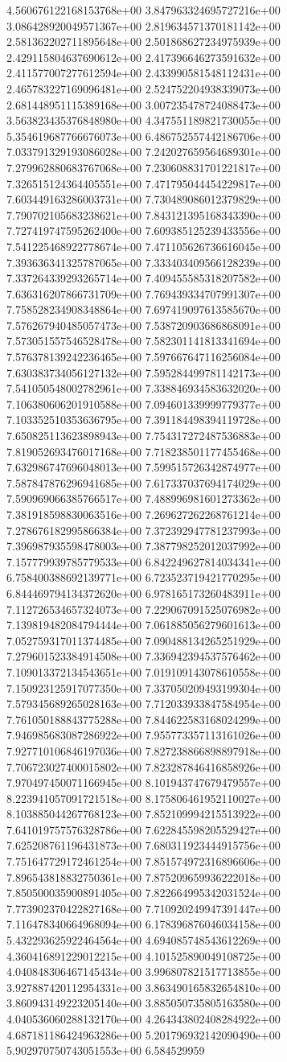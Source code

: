 4.560676122168153768e+00	3.847963324695727216e+00	3.086428920049571367e+00	2.819634571370181142e+00	2.581362202711895648e+00	2.501868627234975939e+00	2.429115804637690612e+00	2.417396646273591632e+00	2.411577007277612594e+00	2.433990581548112431e+00	2.465783227169096481e+00	2.524752204938339073e+00	2.681448951115389168e+00	3.007235478724088473e+00	3.563823435376848980e+00	4.347551189821730055e+00	5.354619687766676073e+00	6.486752557442186706e+00	7.033791329193086028e+00	7.242027659564689301e+00	7.279962880683767068e+00	7.230608831701221817e+00	7.326515124364405551e+00	7.471795044454229817e+00	7.603449163286003731e+00	7.730489086012379829e+00	7.790702105683238621e+00	7.843121395168343390e+00	7.727419747595262400e+00	7.609385125239433556e+00	7.541225468922778674e+00	7.471105626736616045e+00	7.393636341325787065e+00	7.333403409566128239e+00	7.337264339293265714e+00	7.409455585318207582e+00	7.636316207866731709e+00	7.769439334707991307e+00	7.758528234908348864e+00	7.697419097613585670e+00	7.576267940485057473e+00	7.538720903686868091e+00	7.573051557546528478e+00	7.582301141813341694e+00	7.576378139242236465e+00	7.597667647116256084e+00	7.630383734056127132e+00	7.595284499781142173e+00	7.541050548002782961e+00	7.338846934583632020e+00	7.106380606201910588e+00	7.094601339999779377e+00	7.103352510353636795e+00	7.391184498394119728e+00	7.650825113623898943e+00	7.754317272487536883e+00	7.819052693476017168e+00	7.718238501177455468e+00	7.632986747696048013e+00	7.599515726342874977e+00	7.587847876296941685e+00	7.617337037694174029e+00	7.590969066385766517e+00	7.488996981601273362e+00	7.381918598830063516e+00	7.269627262268761214e+00	7.278676182995866384e+00	7.372392947781237993e+00	7.396987935598478003e+00	7.387798252012037992e+00	7.157779939785779533e+00	6.842249627814034341e+00	6.758400388692139771e+00	6.723523719421770295e+00	6.844469794134372620e+00	6.978165173260483911e+00	7.112726534657324073e+00	7.229067091525076982e+00	7.139819482084794444e+00	7.061885056279601613e+00	7.052759317011374485e+00	7.090488134265251929e+00	7.279601523384914508e+00	7.336942394537576462e+00	7.109013372134543651e+00	7.019109143078610558e+00	7.150923125917077350e+00	7.337050209493199304e+00	7.579345689265028163e+00	7.712033933847584954e+00	7.761050188843775288e+00	7.844622583168024299e+00	7.946985683087286922e+00	7.955773357113161026e+00	7.927710106846197036e+00	7.827238866898897918e+00	7.706723027400015802e+00	7.823287846416858926e+00	7.970497450071166945e+00	8.101943747679479557e+00	8.223941057091721518e+00	8.175806461952110027e+00	8.103885044267768123e+00	7.852109994215513922e+00	7.641019757576328786e+00	7.622845598205529427e+00	7.625208761196431873e+00	7.680311923444915756e+00	7.751647729172461254e+00	7.851574972316896606e+00	7.896543818832750361e+00	7.875209659936222018e+00	7.850500035900891405e+00	7.822664995342031524e+00	7.773902370422827168e+00	7.710920249947391447e+00	7.116478340664968094e+00	6.178396876046034158e+00	5.432293625922464564e+00	4.694085748543612269e+00	4.360416891229012215e+00	4.101525890049108725e+00	4.040848306467145434e+00	3.996807821517713855e+00	3.927887420112954331e+00	3.863490165832654810e+00	3.860943149223205140e+00	3.885050735805163580e+00	4.040536060288132170e+00	4.264343802408284922e+00	4.687181186424963286e+00	5.201796932142090490e+00	5.902970750743051553e+00	6.584529959